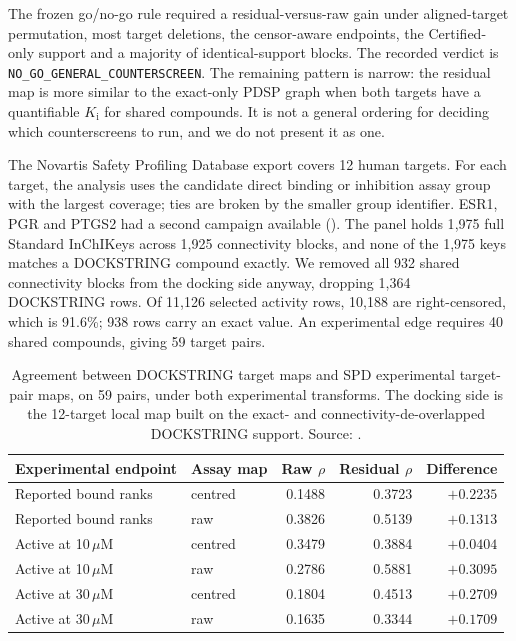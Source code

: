 The frozen go/no-go rule required a residual-versus-raw gain under aligned-target permutation,
most target deletions, the censor-aware endpoints, the Certified-only support and a majority of
identical-support blocks. The recorded verdict is
\texttt{NO\_GO\_GENERAL\_COUNTERSCREEN}. The remaining pattern is narrow: the residual map is
more similar to the exact-only PDSP graph when both targets have a quantifiable $K_\mathrm{i}$
for shared compounds. It is not a general ordering for deciding which
counterscreens to run, and we do not present it as one.


The Novartis Safety Profiling Database export covers 12 human targets. For each target, the
analysis uses the candidate direct binding or inhibition assay group with the largest coverage;
ties are broken by the smaller group identifier.
ESR1, PGR and PTGS2 had a second campaign available
(). The panel holds 1{,}975 full
Standard InChIKeys across 1{,}925 connectivity blocks, and none of the 1{,}975 keys matches a
DOCKSTRING compound exactly. We removed all 932 shared connectivity blocks from the docking side
anyway, dropping 1{,}364 DOCKSTRING rows. Of 11{,}126 selected activity rows, 10{,}188 are
right-censored, which is 91.6\%; 938 rows carry an exact value. An experimental edge requires 40
shared compounds, giving 59 target pairs.

\begin{table}[htbp]
\centering
\small
\setlength{\tabcolsep}{5pt}
\caption[Docking and SPD target-pair map agreement]{Agreement between DOCKSTRING target maps and SPD experimental target-pair maps, on 59
pairs, under both experimental transforms. The docking side is the 12-target local map built on
the exact- and connectivity-de-overlapped DOCKSTRING support. Source:
.}
\label{tab:s6-spd}
\begin{tabular}{llrrr}
\toprule
Experimental endpoint & Assay map & Raw $\rho$ & Residual $\rho$ & Difference \\
\midrule
Reported bound ranks     & centred & 0.1488 & 0.3723 & $+0.2235$ \\
Reported bound ranks     & raw     & 0.3826 & 0.5139 & $+0.1313$ \\
Active at 10\,$\mu$M     & centred & 0.3479 & 0.3884 & $+0.0404$ \\
Active at 10\,$\mu$M     & raw     & 0.2786 & 0.5881 & $+0.3095$ \\
Active at 30\,$\mu$M     & centred & 0.1804 & 0.4513 & $+0.2709$ \\
Active at 30\,$\mu$M     & raw     & 0.1635 & 0.3344 & $+0.1709$ \\
\bottomrule
\end{tabular}
\end{table}

